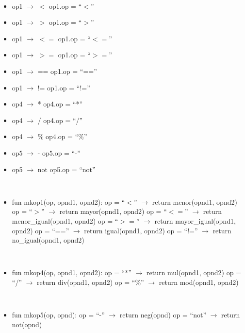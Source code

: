 \documentclass[11pt]{article}
\begin{document}
        \ 
        \begin{itemize}
            \item op1 $\rightarrow$ $<$
                \subitem op1.op = “$<$”
            \item op1 $\rightarrow$ $>$
                \subitem op1.op = “$>$”
            \item op1 $\rightarrow$ $<=$
                \subitem op1.op = “$<=$”
            \item op1 $\rightarrow$ $>=$
                \subitem op1.op = “$>=$”
            \item op1 $\rightarrow$ ==
                \subitem op1.op = “==”
            \item op1 $\rightarrow$ !=
                \subitem op1.op = “!=”
            \item op4 $\rightarrow$ *
                \subitem op4.op = “*”
            \item op4 $\rightarrow$ /
                \subitem op4.op = “/”
            \item op4 $\rightarrow$ \%
                \subitem op4.op = “\%”
            \item op5 $\rightarrow$ -
                \subitem op5.op = “-”
            \item op5 $\rightarrow$ not
                \subitem op5.op = “not”
        \end{itemize}
        \
        \begin{itemize}
            \item fun mkop1(op, opnd1, opnd2):
                \subitem op = “$<$”    $\rightarrow$ return menor(opnd1, opnd2)
                \subitem op = “$>$”   $\rightarrow$  return mayor(opnd1, opnd2)
                \subitem op = “$<=$”  $\rightarrow$  return menor\_igual(opnd1, opnd2)
                \subitem op = “$>=$”  $\rightarrow$  return mayor\_igual(opnd1, opnd2)
                \subitem op = “==”  $\rightarrow$  return igual(opnd1, opnd2)
                \subitem op = “!=”   $\rightarrow$  return no\_igual(opnd1, opnd2)
        \end{itemize}
        \
        \begin{itemize}
            \item fun mkop4(op, opnd1, opnd2):
                \subitem op = “*”   $\rightarrow$  return mul(opnd1, opnd2)
                \subitem op = “/”    $\rightarrow$  return div(opnd1, opnd2)
                \subitem op = “\%” $\rightarrow$  return mod(opnd1, opnd2)
        \end{itemize}
        \
        \begin{itemize}
            \item fun mkop5(op, opnd):
                \subitem op = “-” $\rightarrow$      return neg(opnd)
                \subitem op = “not” $\rightarrow$  return not(opnd)
        \end{itemize}
\end{document}
